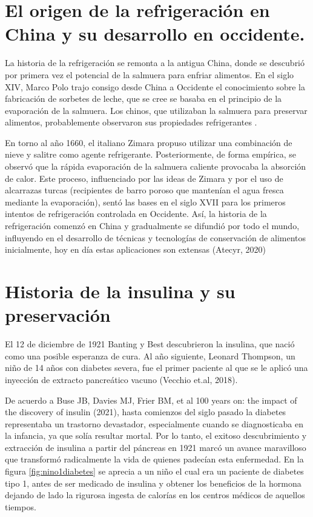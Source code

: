 \section{El origen de la refrigeración en China y su desarrollo en occidente.}
La historia de la refrigeración se remonta a la antigua China, donde se descubrió por primera vez el potencial de la salmuera para enfriar alimentos. En el siglo XIV, Marco Polo trajo consigo desde China a Occidente el conocimiento sobre la fabricación de sorbetes de leche, que se cree se basaba en el principio de la evaporación de la salmuera. Los chinos, que utilizaban la salmuera para preservar alimentos, probablemente observaron sus propiedades refrigerantes \cite{curiosfera2023}. 

En torno al año 1660, el italiano Zimara propuso utilizar una combinación de nieve y salitre como agente refrigerante. Posteriormente, de forma empírica, se observó que la rápida evaporación de la salmuera caliente provocaba la absorción de calor. Este proceso, influenciado por las ideas de Zimara y por el uso de alcarrazas turcas (recipientes de barro poroso que mantenían el agua fresca mediante la evaporación), sentó las bases en el siglo XVII para los primeros intentos de refrigeración controlada en Occidente. Así, la historia de la refrigeración comenzó en China y gradualmente se difundió por todo el mundo, influyendo en el desarrollo de técnicas y tecnologías de conservación de alimentos inicialmente, hoy en día estas aplicaciones son extensas (Atecyr, 2020)

\section{Historia de la insulina y su preservación}
El 12 de diciembre de 1921 Banting y Best descubrieron la insulina, que nació como una posible esperanza de cura. Al año siguiente, Leonard Thompson, un niño de 14 años con diabetes severa, fue el primer paciente al que se le aplicó una inyección de extracto pancreático vacuno (Vecchio et.al, 2018).

De acuerdo a Buse JB, Davies MJ, Frier BM, et al 100 years on: the impact of the discovery of insulin  (2021), hasta comienzos del siglo pasado la diabetes representaba un trastorno devastador, especialmente cuando se diagnosticaba en la infancia, ya que solía resultar mortal. Por lo tanto, el exitoso descubrimiento y extracción de insulina a partir del páncreas en 1921 marcó un avance maravilloso que transformó radicalmente la vida de quienes padecían esta enfermedad. En la figura \ref{fig:nino1diabetes} se aprecia a un niño el cual era un paciente de diabetes tipo 1, antes de ser medicado de insulina y obtener los beneficios de la hormona dejando de lado la rigurosa ingesta de calorías en los centros médicos de aquellos tiempos.


